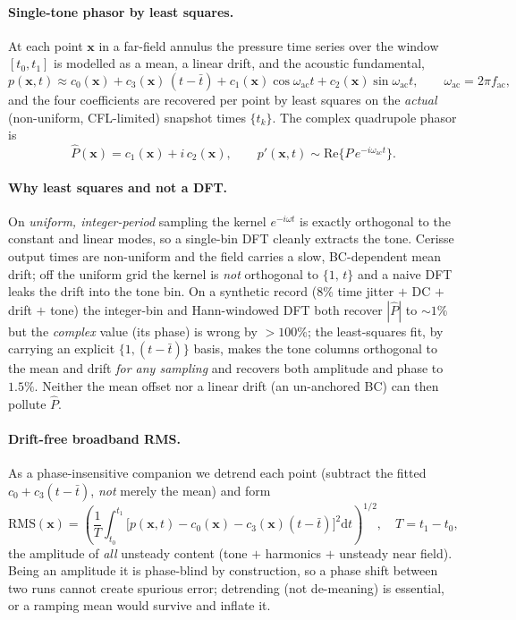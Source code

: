 \documentclass[11pt]{article}
\newcommand{\dd}{\mathrm{d}}
\begin{document}
\paragraph{Single-tone phasor by least squares.} At each point $\bm x$ in a
far-field annulus the pressure time series over the window $[t_0,t_1]$ is
modelled as a mean, a linear drift, and the acoustic fundamental,
\begin{equation}
p(\bm x,t)\approx c_0(\bm x)+c_3(\bm x)\,(t-\bar t)
+c_1(\bm x)\cos\omega_{\text{ac}}t+c_2(\bm x)\sin\omega_{\text{ac}}t,
\qquad \omega_{\text{ac}}=2\pi f_{\text{ac}},
\end{equation}
and the four coefficients are recovered per point by least squares on the
\emph{actual} (non-uniform, CFL-limited) snapshot times $\{t_k\}$. The complex
quadrupole phasor is
\begin{equation}
\hat P(\bm x)=c_1(\bm x)+i\,c_2(\bm x),\qquad
p'(\bm x,t)\sim\mathrm{Re}\big\{\hat P\,e^{-i\omega_{\text{ac}}t}\big\}.
\end{equation}

\paragraph{Why least squares and not a DFT.} On \emph{uniform, integer-period}
sampling the kernel $e^{-i\omega t}$ is exactly orthogonal to the constant and
linear modes, so a single-bin DFT cleanly extracts the tone. Cerisse output
times are non-uniform and the field carries a slow, BC-dependent mean drift; off
the uniform grid the kernel is \emph{not} orthogonal to $\{1,\,t\}$ and a naive
DFT leaks the drift into the tone bin. On a synthetic record (8\% time jitter
$+$ DC $+$ drift $+$ tone) the integer-bin and Hann-windowed DFT both recover
$|\hat P|$ to $\sim1\%$ but the \emph{complex} value (its phase) is wrong by
$>100\%$; the least-squares fit, by carrying an explicit $\{1,(t-\bar t)\}$
basis, makes the tone columns orthogonal to the mean and drift \emph{for any
sampling} and recovers both amplitude and phase to $1.5\%$. Neither the mean
offset nor a linear drift (an un-anchored BC) can then pollute $\hat P$.

\paragraph{Drift-free broadband RMS.} As a phase-insensitive companion we
detrend each point (subtract the fitted $c_0+c_3(t-\bar t)$, \emph{not} merely
the mean) and form
\begin{equation}
\mathrm{RMS}(\bm x)=\left(\frac1{T}\int_{t_0}^{t_1}\!
\big[p(\bm x,t)-c_0(\bm x)-c_3(\bm x)(t-\bar t)\big]^2\dd t\right)^{1/2},
\quad T=t_1-t_0,
\end{equation}
the amplitude of \emph{all} unsteady content (tone $+$ harmonics $+$ unsteady
near field). Being an amplitude it is phase-blind by construction, so a phase
shift between two runs cannot create spurious error; detrending (not de-meaning)
is essential, or a ramping mean would survive and inflate it.
\end{document}
